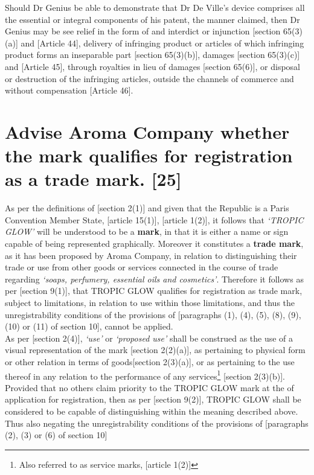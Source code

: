 \documentclass[11pt]{article}
\begin{document}
Should Dr Genius be able to demonstrate that Dr De Ville's device comprises all the essential or integral components of his patent, the manner claimed, then Dr Genius may be see relief in the form of and interdict or injunction [section 65(3)(a)]\cite{rsa78_patents_act} and [Article 44]\cite{wto17_trips}, delivery of infringing product or articles of which infringing product forms an inseparable part [section 65(3)(b)]\cite{rsa78_patents_act}, damages [section 65(3)(c)]\cite{rsa78_patents_act} and [Article 45]\cite{wto17_trips}, through royalties in lieu of damages [section 65(6)]\cite{rsa78_patents_act}, or disposal or destruction of the infringing articles, outside the channels of commerce and without compensation [Article 46]\cite{wto17_trips}.


\section{Advise Aroma Company whether the mark qualifies for registration as a trade mark. [25]}
\label{sec:orgc9ed32e}
As per the definitions of [section 2(1)]\cite{rsa93_tm_act} and given that the
Republic is a Paris Convention Member State, [article 15(1)]\cite{wto17_trips},
[article 1(2)]\cite{wipo83_paris_conve_protect_ip}, it follows that \emph{`TROPIC
GLOW'} will be understood to be a \textbf{mark}, in that it is either a name or sign
capable of being represented graphically. Moreover it constitutes a \textbf{trade
mark}, as it has been proposed by Aroma Company, in relation to distinguishing
their trade or use from other goods or services connected in the course of trade
regarding \emph{`soaps, perfumery, essential oils and cosmetics'}. Therefore it
follows as per [section 9(1)]\cite{rsa93_tm_act}, that TROPIC GLOW qualifies for
registration as trade mark, subject to limitations, in relation to use within
those limitations, and thus the unregistrability conditions of the
provisions of [paragraphs (1), (4), (5), (8), (9), (10) or (11) of section 10]\cite{rsa93_tm_act},
cannot be applied.\\

As per [section 2(4)]\cite{rsa93_tm_act}, \emph{`use'} or \emph{`proposed use'} shall be
construed as the use of a visual representation of the mark [section
2(2)(a)]\cite{rsa93_tm_act}, as pertaining to physical form or other relation in
terms of goods[section 2(3)(a)]\cite{rsa93_tm_act}, or as pertaining to the use
thereof in any relation to the performance of any services\footnote{Also referred to
as service marks, [article 1(2)]\cite{wipo83_paris_conve_protect_ip}} [section
2(3)(b)]\cite{rsa93_tm_act}. Provided that no others claim priority to the TROPIC
GLOW mark at the  of application for registration, then as per [section
9(2)]\cite{rsa93_tm_act}, TROPIC GLOW shall be considered to be capable of
distinguishing within the meaning described above. Thus also negating the
unregistrability conditions of the provisions of [paragraphs (2), (3) or (6) of section 10]\cite{rsa93_tm_act}\\
\end{document}
